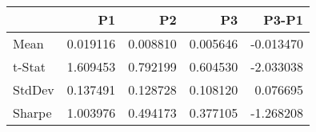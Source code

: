 \begin{tabular}{lrrrr}
\toprule
 & P1 & P2 & P3 & P3-P1 \\
\midrule
Mean & 0.019116 & 0.008810 & 0.005646 & -0.013470 \\
t-Stat & 1.609453 & 0.792199 & 0.604530 & -2.033038 \\
StdDev & 0.137491 & 0.128728 & 0.108120 & 0.076695 \\
Sharpe & 1.003976 & 0.494173 & 0.377105 & -1.268208 \\
\bottomrule
\end{tabular}

